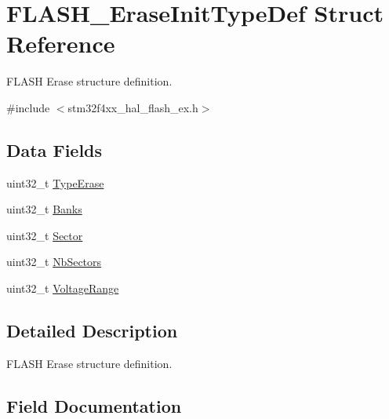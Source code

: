 \hypertarget{struct_f_l_a_s_h___erase_init_type_def}{}\section{F\+L\+A\+S\+H\+\_\+\+Erase\+Init\+Type\+Def Struct Reference}
\label{struct_f_l_a_s_h___erase_init_type_def}


F\+L\+A\+SH Erase structure definition.  




{\ttfamily \#include $<$stm32f4xx\+\_\+hal\+\_\+flash\+\_\+ex.\+h$>$}

\subsection*{Data Fields}
\begin{DoxyCompactItemize}
\item 
uint32\+\_\+t \mbox{\hyperlink{struct_f_l_a_s_h___erase_init_type_def_ae2154c09320f3ef7feb8f4a84e9ac17b}{Type\+Erase}}
\item 
uint32\+\_\+t \mbox{\hyperlink{struct_f_l_a_s_h___erase_init_type_def_aa07868a5b012861c6111322c3dccdbec}{Banks}}
\item 
uint32\+\_\+t \mbox{\hyperlink{struct_f_l_a_s_h___erase_init_type_def_a6c86f87bb12212ce21da3aec61759a52}{Sector}}
\item 
uint32\+\_\+t \mbox{\hyperlink{struct_f_l_a_s_h___erase_init_type_def_a0511632174dfb4c07e218a857e6a6406}{Nb\+Sectors}}
\item 
uint32\+\_\+t \mbox{\hyperlink{struct_f_l_a_s_h___erase_init_type_def_a85dd2161de6dd6ee5b24e87dcc674024}{Voltage\+Range}}
\end{DoxyCompactItemize}


\subsection{Detailed Description}
F\+L\+A\+SH Erase structure definition. 

\subsection{Field Documentation}
\mbox{\label{struct_f_l_a_s_h___erase_init_type_def_aa07868a5b012861c6111322c3dccdbec}} 
